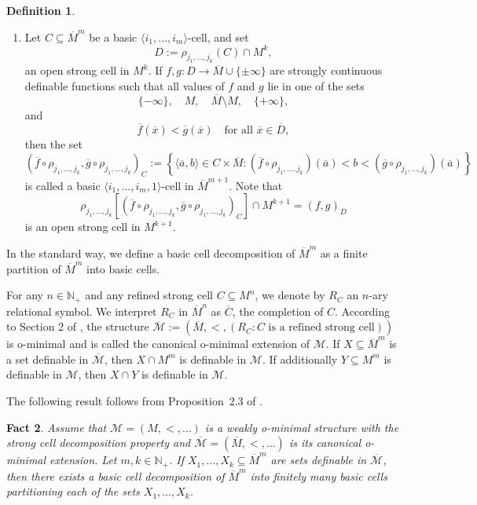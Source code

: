 \documentclass{amsart}
\theoremstyle{definition}
\newtheorem{definition}{Definition}[section]
\theoremstyle{plain}
\newtheorem{fact}[definition]{Fact}
\newcommand{\bN}{\mathbb N}
\newcommand{\cM}{\mathcal M}
\newcommand{\ov}[1]{\overline{#1}}
\def \M {{\mathcal M}}
\newcommand{\N}{\mathbb{N}}
\begin{document}
\begin{definition}
\begin{enumerate}
		\item
		Let $C \subseteq \overline{M}^m$ be a basic $\langle i_1, \dots, i_m \rangle$-cell, and set
		\[
		D := \rho_{j_1, \dots, j_k}(C) \cap M^k,
		\]
		an open strong cell in $M^k$.
		If $f, g : D \to \overline{M} \cup \{ \pm \infty \}$ are strongly continuous definable functions such that
		all values of $f$ and $g$ lie in one of the sets
		\[
		\{ -\infty \}, \quad M, \quad \overline{M} \setminus M, \quad \{ +\infty \},
		\]
		and
		\[
		\overline{f}(\overline{x}) < \overline{g}(\overline{x})
		\quad \text{for all } \overline{x} \in \overline{D},
		\]
		then the set
		\[
		(\overline{f} \circ \rho_{j_1, \dots, j_k}, \overline{g} \circ \rho_{j_1, \dots, j_k})_C
		:= \left\{
		\langle \overline{a}, b \rangle \in C \times \overline{M} :
		(\overline{f} \circ \rho_{j_1, \dots, j_k})(\overline{a}) < b <
		(\overline{g} \circ \rho_{j_1, \dots, j_k})(\overline{a})
		\right\}
		\]
		is called a basic $\langle i_1, \dots, i_m, 1 \rangle$-cell in $\overline{M}^{m+1}$.
		Note that
		\[
		\rho_{j_1, \dots, j_k}
		\left[
		(\overline{f} \circ \rho_{j_1, \dots, j_k},
		\overline{g} \circ \rho_{j_1, \dots, j_k})_C
		\right]
		\cap M^{k+1}
		= (f, g)_D
		\]
		is an open strong cell in $M^{k+1}$.
	\end{enumerate}
	
	In the standard way, we define a basic cell decomposition of $\overline{M}^m$ as a finite partition of $\overline{M}^m$ into basic cells.
\end{definition}





For any $n \in \bN_{+}$ and any refined strong cell $C \subseteq M^n$,
we denote by $R_C$ an $n$-ary relational symbol.
We interpret $R_C$ in $\ov{M}^n$ as $\ov{C}$, the completion of $C$.
According to Section 2 of \cite{W2}, 
the structure $\ov{\mathcal M} := (\ov{M}, <, (R_C: C \text{ is a refined strong cell}))$ is o-minimal 
and is called the canonical o-minimal extension of $\cM$.
If $X \subseteq \ov{M}^m$ is  a set definable in $\ov{\cM}$, then $X \cap M^m$ is definable in $\cM$.
If additionally $Y \subseteq M^m$ is definable in $\cM$, then $X \cap Y$ is definable in $\cM$.


The following result follows from Proposition~2.3 of \cite{W2}.

\begin{fact} \label{basic}
	Assume that $\mathcal M = (M, <, \dots)$ is a weakly o-minimal structure with the strong cell decomposition property and $\ov{\mathcal M} = (\ov{M}, <, \dots)$ is its canonical o-minimal extension.
	Let $m, k \in \N_{+}$.
	If $X_1, \dots, X_k \subseteq \ov{M}^m$ are sets definable in $\ov{\M}$,
	then there exists a basic cell decomposition of $\ov{M}^m$ into finitely many basic cells partitioning each of the sets $X_1, \ldots, X_k$.
\end{fact}
\end{document}
